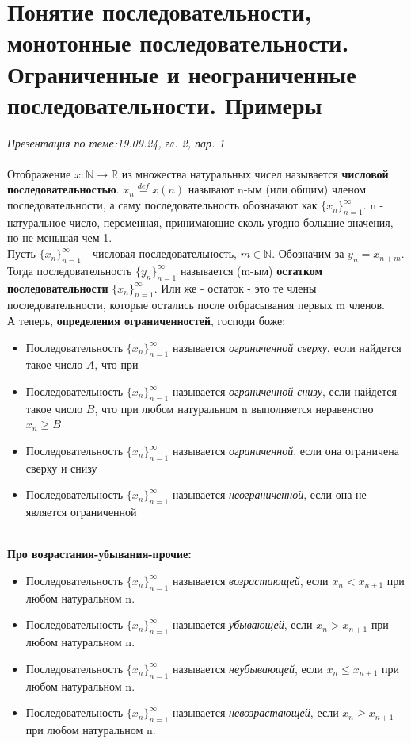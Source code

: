 \documentclass[10pt, a4paper,twocolumn]{article}
\begin{document}
\section{Понятие последовательности, монотонные последовательности. Ограниченные и неограниченные последовательности. Примеры}
\textsl{Презентация по теме:19.09.24, гл. 2, пар. 1}
\\ \\Отображение $x : \mathbb{N} \rightarrow \mathbb{R}$ из множества натуральных чисел называется \textbf{числовой последовательностью}. $x_{n} \stackrel{def}{=} x(n)$ называют n-ым (или общим) членом последовательности, а саму последовательность обозначают как\textsl{ $\{x_{n}\}^{\infty}_{n = 1}$}. n - натуральное число, переменная, принимающие сколь угодно большие значения, но не меньшая чем 1.
\\Пусть $\{x_{n}\}^{\infty}_{n = 1}$ - числовая последовательность, $m \in \mathbb{N}$. Обозначим за $y_n = x_{n + m}$. Тогда последовательность $\{y_{n}\}^{\infty}_{n = 1}$ называется (m-ым) \textbf{остатком последовательности} $\{x_{n}\}^{\infty}_{n = 1}$. Или же - остаток - это те члены последовательности, которые остались после отбрасывания первых m членов.
\\А теперь, \textbf{определения ограниченностей}, господи боже:
\begin{itemize}
    \item Последовательность $\{x_{n}\}^{\infty}_{n = 1}$ называется \textsl{ограниченной сверху}, если найдется такое число $A$, что при
    \item Последовательность $\{x_{n}\}^{\infty}_{n = 1}$ называется \textsl{ограниченной снизу}, если найдется такое число $B$, что при любом натуральном n выполняется неравенство $x_n \geq B$
    \item Последовательность $\{x_{n}\}^{\infty}_{n = 1}$ называется \textsl{ограниченной}, если она ограничена сверху и снизу
    \item Последовательность $\{x_{n}\}^{\infty}_{n = 1}$ называется \textsl{неограниченной}, если она не является ограниченной
\end{itemize}
\textbf{\\Про возрастания-убывания-прочие:}
\begin{itemize}
    \item Последовательность $\{x_{n}\}^{\infty}_{n = 1}$ называется \textsl{возрастающей}, если $x_{n} < x_{n + 1}$ при любом натуральном n.
    \item Последовательность $\{x_{n}\}^{\infty}_{n = 1}$ называется \textsl{убывающей}, если $x_{n} > x_{n + 1}$ при любом натуральном n.
    \item Последовательность $\{x_{n}\}^{\infty}_{n = 1}$ называется \textsl{неубывающей}, если $x_{n} \leq x_{n + 1}$ при любом натуральном n.
    \item Последовательность $\{x_{n}\}^{\infty}_{n = 1}$ называется \textsl{невозрастающей}, если $x_{n} \geq x_{n + 1}$ при любом натуральном n.
\end{itemize}
\end{document}
